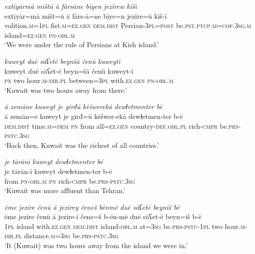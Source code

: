 \ea \label{ŽM.38}
\textit{extīyārmā mištū ā fārsāne bīyen jezīrew kīšī} \\ 
\gll extīyār=mā mišt=ū ā fārs-ā=ne bīye=n jezīre=ū kīš-ī \\ 
 volition\textsc{.m}\textsc{=\textsc{1pl}} fist\textsc{.m}\textsc{=ez.gen} \textsc{dem.dist} Persian\textsc{-3pl}\textsc{=\textsc{post}} be\textsc{.pst}\textsc{.ptcp}\textsc{.m}\textsc{=cop}\textsc{.3sg}\textsc{.m} island\textsc{=ez.gen} \textsc{pn}\textsc{-obl}\textsc{.m} \\ 
\glt `We were under the rule of Persians at Kish island.'
\z 
 
\ea \label{ŽM.41}
\textit{kuweyt duē sāʕetē beynšā čenū kuweytī} \\ 
\gll kuweyt duē sāʕet-ē beyn=šā čenū kuweyt-ī \\ 
 \textsc{pn} two hour\textsc{.m}\textsc{-dir}\textsc{.pl} between\textsc{=3pl} with\textsc{\textsc{.ez}.gen} \textsc{pn}\textsc{-obl}\textsc{.m} \\ 
\glt `Kuwait was two hours away from there.'
\z 
 
\ea \label{ŽM.43}
\textit{ā zemāne kuweyt je girđū kēšwerekā dewɫetmenter bē} \\ 
\gll ā zemān=e kuweyt je girđ=ū kēšwer-ekā dewɫetmen-ter b-ē \\ 
 \textsc{dem.dist} time\textsc{.m}\textsc{=dem} \textsc{pn} from all\textsc{=ez.gen} country\textsc{-def}\textsc{.obl}\textsc{.pl} rich\textsc{-cmpr} be\textsc{.prs}\textsc{-pstc}\textsc{.3sg} \\ 
\glt `Back then, Kuwait was the richest of all countries.'
\z 
 
\ea \label{ŽM.44}
\textit{je tārānī kuweyt dewɫetmenter bē} \\ 
\gll je tārān-ī kuweyt dewɫetmen-ter b-ē \\ 
 from \textsc{pn}\textsc{-obl}\textsc{.m} \textsc{pn} rich\textsc{-cmpr} be\textsc{.prs}\textsc{-pstc}\textsc{.3sg} \\ 
\glt `Kuwait was more affluent than Tehran.'
\z 
 
\ea \label{ŽM.45}
\textit{ēme jezīre čenū ā jezīrey čeneš bēnmē duē sāʕetē beyniš bē} \\ 
\gll ēme jezīre čenū ā jezīre-ī čene=š b-ēn-mē duē sāʕet-ē beyn=iš b-ē \\ 
 \textsc{1pl} island with\textsc{\textsc{.ez}.gen} \textsc{dem.dist} island\textsc{-obl}\textsc{.m} at\textsc{=3sg} be\textsc{.prs}\textsc{-pstc}\textsc{-\textsc{1pl}} two hour\textsc{.m}\textsc{-dir}\textsc{.pl} distance\textsc{.m}\textsc{=3sg} be\textsc{.prs}\textsc{-pstc}\textsc{.3sg} \\ 
\glt `It (Kuwait) was two hours away from the island we were in.'
\z 
 
